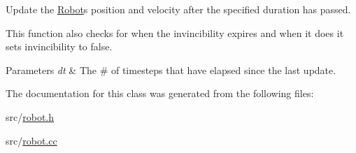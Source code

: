 Update the \hyperlink{classRobot}{Robot}\textquotesingle{}s position and velocity after the specified duration has passed. 

This function also checks for when the invincibility expires and when it does it sets invincibility to false.


\begin{DoxyParams}{Parameters}
{\em dt} & The \# of timesteps that have elapsed since the last update. \\
\hline
\end{DoxyParams}


The documentation for this class was generated from the following files\+:\begin{DoxyCompactItemize}
\item 
src/\hyperlink{robot_8h}{robot.\+h}\item 
src/\hyperlink{robot_8cc}{robot.\+cc}\end{DoxyCompactItemize}
